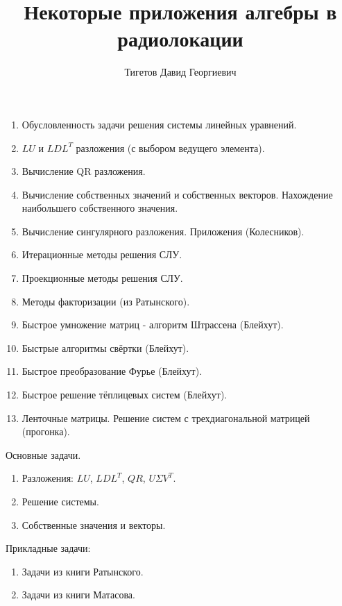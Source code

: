 \documentclass[a4paper,12pt]{book}
\begin{document}
    \title{Некоторые приложения алгебры в радиолокации}
    \author{Тигетов Давид Георгиевич}
    \maketitle

    \tableofcontents

    

    

    

    

    

    
    
    
    
    
    

    

    \begin{enumerate}
        \item Обусловленность задачи решения системы линейных уравнений.
        \item $LU$ и $LDL^T$ разложения (с выбором ведущего элемента).
        \item Вычисление QR разложения.
        \item Вычисление собственных значений и собственных векторов. Нахождение наибольшего собственного значения.
        \item Вычисление сингулярного разложения. Приложения (Колесников).
        \item Итерационные методы решения СЛУ.
        \item Проекционные методы решения СЛУ.
        \item Методы факторизации (из Ратынского).
        \item Быстрое умножение матриц - алгоритм Штрассена (Блейхут).
        \item Быстрые алгоритмы свёртки (Блейхут).
        \item Быстрое преобразование Фурье (Блейхут).
        \item Быстрое решение тёплицевых систем (Блейхут).
        \item Ленточные матрицы. Решение систем с трехдиагональной матрицей (прогонка).
    \end{enumerate}

    Основные задачи.
    \begin{enumerate}
        \item Разложения: $LU$, $LDL^T$, $QR$, $U \Sigma V^T$.
        \item Решение системы.
        \item Собственные значения и векторы.
    \end{enumerate}

    Прикладные задачи:
    \begin{enumerate}
        \item Задачи из книги Ратынского.
        \item Задачи из книги Матасова.
    \end{enumerate}
\end{document}
